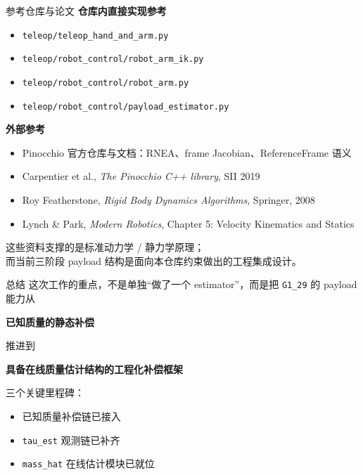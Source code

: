\documentclass[aspectratio=169,11pt]{ctexbeamer}
\begin{document}
\begin{frame}{参考仓库与论文}
  \textbf{仓库内直接实现参考}
  \begin{itemize}
    \item \texttt{teleop/teleop\_hand\_and\_arm.py}
    \item \texttt{teleop/robot\_control/robot\_arm\_ik.py}
    \item \texttt{teleop/robot\_control/robot\_arm.py}
    \item \texttt{teleop/robot\_control/payload\_estimator.py}
  \end{itemize}

  \textbf{外部参考}
  \begin{itemize}
    \item Pinocchio 官方仓库与文档：RNEA、frame Jacobian、ReferenceFrame 语义
    \item Carpentier et al., \emph{The Pinocchio C++ library}, SII 2019
    \item Roy Featherstone, \emph{Rigid Body Dynamics Algorithms}, Springer, 2008
    \item Lynch \& Park, \emph{Modern Robotics}, Chapter 5: Velocity Kinematics and Statics
  \end{itemize}

  \vspace{0.4em}
  这些资料支撑的是标准动力学 / 静力学原理；\\
  而当前三阶段 payload 结构是面向本仓库约束做出的工程集成设计。
\end{frame}

\begin{frame}{总结}
  这次工作的重点，不是单独“做了一个 estimator”，而是把 \texttt{G1\_29} 的 payload 能力从

  \vspace{0.4em}
  \textbf{已知质量的静态补偿}

  \vspace{0.3em}
  推进到

  \vspace{0.3em}
  \textbf{具备在线质量估计结构的工程化补偿框架}

  \vspace{0.6em}
  三个关键里程碑：
  \begin{itemize}
    \item 已知质量补偿链已接入
    \item \texttt{tau\_est} 观测链已补齐
    \item \texttt{mass\_hat} 在线估计模块已就位
  \end{itemize}
\end{frame}
\end{document}
